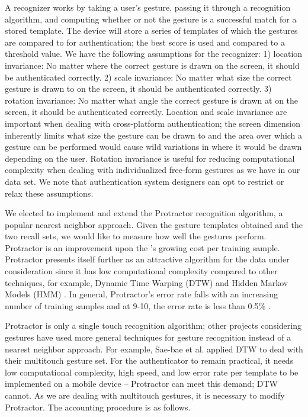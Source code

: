 \documentclass{sig-alternate-10pt}
\begin{document}
A recognizer works by taking a user's gesture,  passing it through a recognition algorithm, and computing whether or not the gesture is a successful match for a stored template. The device will store a series of templates of which the gestures are compared to for authentication; the best score is used and compared to a threshold value. We have the following assumptions for the recognizer: 1) location invariance: No matter where the correct gesture is drawn on the screen, it should be authenticated correctly.  2) scale invariance: No matter what size the correct gesture is drawn to on the screen, it should be authenticated correctly. 3) rotation invariance: No matter what angle the correct gesture is drawn at on the screen, it should be authenticated correctly. Location and scale invariance are important when dealing with cross-platform authentication; the screen dimension inherently limits what size the gesture can be drawn to and the area over which a gesture can be performed would cause wild variations in where it would be drawn depending on the user. Rotation invariance is useful for reducing computational complexity when dealing with individualized free-form gestures as we have in our data set. We note that authentication system designers can opt to restrict or relax these assumptions.







	We elected to implement and extend the Protractor \cite{Li:2010:PFA:1753326.1753654} recognition algorithm, a popular nearest neighbor approach. Given the gesture templates obtained and the two recall sets, we would like to measure how well the gestures perform. Protractor is an improvement upon the \1's growing cost per training sample. Protractor presents itself further as an attractive algorithm for the data under consideration since it has low computational complexity compared to other techniques, for example, Dynamic Time Warping (DTW) \cite{Wobbrock:2007:GWL:1294211.1294238} and Hidden Markov Models (HMM) \cite{hmm1,hmm2}.  In general, Protractor's error rate falls with an increasing number of training samples and at 9-10, the error rate is less than 0.5\% \cite{Li:2010:PFA:1753326.1753654}. 

	Protractor is only a single touch recognition algorithm; other projects considering gestures have used more general techniques for gesture recognition instead of a nearest neighbor approach. For example, Sae-bae et al. \cite{Sae-Bae:2012:BGN:2207676.2208543} applied DTW to deal with their multitouch gesture set. For the authenticator to remain practical, it needs low computational complexity, high speed,  and low error rate per template to be implemented on a mobile device -- Protractor can meet this demand; DTW cannot. As we are dealing with multitouch gestures, it is necessary to modify Protractor. The accounting procedure is as follows.
	
\end{document}
